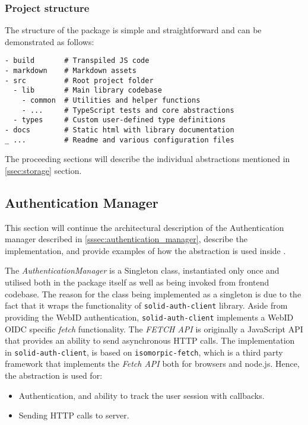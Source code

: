 \subsubsection{Project structure}

The structure of the \lpas{} package is simple and straightforward and can be demonstrated as follows:

\begin{lstlisting}
- build       # Transpiled JS code    
- markdown    # Markdown assets
- src         # Root project folder
  - lib       # Main library codebase
    - common  # Utilities and helper functions
   	- ...     # TypeScript tests and core abstractions
  - types     # Custom user-defined type definitions
- docs        # Static html with library documentation
_ ...         # Readme and various configuration files
\end{lstlisting}

The proceeding sections will describe the individual abstractions mentioned in \autoref{ssec:storage} section.

\subsection{Authentication Manager}

This section will continue the architectural description of the Authentication manager described in \autoref{sssec:authentication_manager}, describe the implementation, and provide examples of how the abstraction is used inside \lpa{}.

The \textit{AuthenticationManager} is a Singleton class, instantiated only once and utilised both in the package itself as well as being invoked from \lpa{} frontend codebase. The reason for the class being implemented as a singleton is due to the fact that it wraps the functionality of \texttt{solid-auth-client} library. Aside from providing the WebID authentication,  \texttt{solid-auth-client} implements a WebID OIDC specific \textit{fetch} functionality. The \textit{FETCH API} is originally a JavaScript API that provides an ability to send asynchronous HTTP calls. The implementation in \texttt{solid-auth-client}, is based on \texttt{isomorpic-fetch}, which is a third party framework that implements the \textit{Fetch API} both for browsers and node.js. Hence, the abstraction is used for:
\begin{itemize}
    \item Authentication, and ability to track the user session with callbacks. 
    \item Sending HTTP calls to \solid{} server.
\end{itemize}


